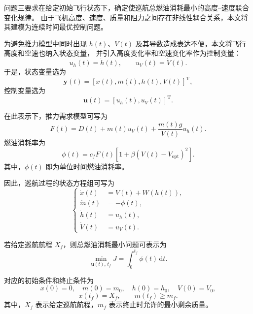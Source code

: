 \documentclass[UTF8]{ctexart}
\begin{document}
问题三要求在给定初始飞行状态下，确定使巡航总燃油消耗最小的高度--速度联合变化规律。
由于飞机高度、速度、质量和阻力之间存在非线性耦合关系，本文将其建模为连续时间最优控制问题。

为避免推力模型中同时出现 $h(t)$、$V(t)$ 及其导数造成表达不便，本文将飞行高度和空速也纳入状态变量，
并引入高度变化率和空速变化率作为控制变量：
\begin{equation}
    u_h(t)=\dot h(t),\qquad u_V(t)=\dot V(t).
    \label{eq:q3_controls}
\end{equation}
于是，状态变量选为
\begin{equation}
    \boldsymbol{y}(t)=\left[x(t),m(t),h(t),V(t)\right]^{\mathrm T},
    \label{eq:q3_states}
\end{equation}
控制变量选为
\begin{equation}
    \boldsymbol{u}(t)=\left[u_h(t),u_V(t)\right]^{\mathrm T}.
    \label{eq:q3_control_vector}
\end{equation}

在此表示下，推力需求模型可写为
\begin{equation}
    F(t)
    =
    D(t)+m(t)u_V(t)+\frac{m(t)g}{V(t)}u_h(t).
    \label{eq:q3_thrust}
\end{equation}
燃油消耗率为
\begin{equation}
    \phi(t)
    =
    c_fF(t)
    \left[
    1+\beta\left(V(t)-V_{\mathrm{opt}}\right)^2
    \right].
    \label{eq:q3_phi}
\end{equation}
其中，$\phi(t)$ 即为单位时间燃油消耗率。

因此，巡航过程的状态方程组可写为
\begin{equation}
\left\{
\begin{aligned}
    \dot x(t) &= V(t)+W(h(t)),\\
    \dot m(t) &= -\phi(t),\\
    \dot h(t) &= u_h(t),\\
    \dot V(t) &= u_V(t).
\end{aligned}
\right.
\label{eq:q3_state_equations}
\end{equation}

若给定巡航航程 $X_f$，则总燃油消耗最小问题可表示为
\begin{equation}
    \min_{\boldsymbol{u}(t),\,t_f}
    J
    =
    \int_{0}^{t_f}\phi(t)\,\mathrm{d}t.
    \label{eq:q3_objective}
\end{equation}

对应的初始条件和终止条件为
\begin{equation}
    x(0)=0,\quad m(0)=m_0,\quad h(0)=h_0,\quad V(0)=V_0,
    \label{eq:q3_initial}
\end{equation}
\begin{equation}
    x(t_f)=X_f,\qquad m(t_f)\geq m_f.
    \label{eq:q3_terminal}
\end{equation}
其中，$X_f$ 表示给定巡航航程，$m_f$ 表示终止时允许的最小剩余质量。
\end{document}
